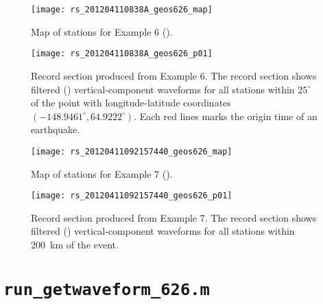 \documentclass[11pt,titlepage,fleqn]{article}
\begin{document}

\clearpage\pagebreak
\begin{figure}
\centering
\texttt{[image: rs\_201204110838A\_geos626\_map]}
\caption[]
{{
Map of stations for Example 6 ().
}}
\label{fig:map_ex06}
\end{figure}

\clearpage\pagebreak
\begin{figure}
\hspace{-1.25cm}
\texttt{[image: rs\_201204110838A\_geos626\_p01]}
\caption[]
{{
Record section produced from Example 6.
The record section shows filtered () vertical-component waveforms for all stations within $25^\circ$ of the point with longitude-latitude coordinates $(-148.9461^\circ, 64.9222^\circ)$. Each red lines marks the origin time of an earthquake.
}}
\label{fig:rs_ex06}
\end{figure}


\clearpage\pagebreak
\begin{figure}
\centering
\texttt{[image: rs\_20120411092157440\_geos626\_map]}
\caption[]
{{
Map of stations for Example 7 ().
}}
\label{fig:map_ex07}
\end{figure}

\clearpage\pagebreak
\begin{figure}
\hspace{-1.25cm}
\texttt{[image: rs\_20120411092157440\_geos626\_p01]}
\caption[]
{{
Record section produced from Example 7.
The record section shows filtered () vertical-component waveforms for all stations within 200~km of the event.
}}
\label{fig:rs_ex07}
\end{figure}


\clearpage\pagebreak

\section{{\tt run\_getwaveform\_626.m}}
\label{sec:script}
\end{document}
